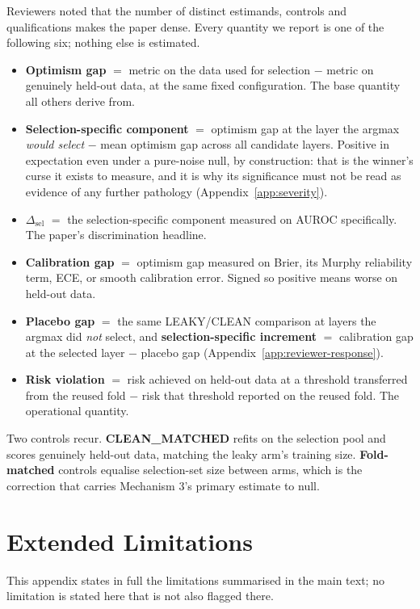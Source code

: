 \documentclass{article}
\begin{document}
Reviewers noted that the number of distinct estimands, controls and
qualifications makes the paper dense. Every quantity we report is one of the
following six; nothing else is estimated.

\begin{itemize}
\itemsep0pt
\item \textbf{Optimism gap} $=$ metric on the data used for selection $-$
  metric on genuinely held-out data, at the same fixed configuration. The base
  quantity all others derive from.
\item \textbf{Selection-specific component} $=$ optimism gap at the layer the
  argmax \emph{would select} $-$ mean optimism gap across all candidate
  layers. Positive in expectation even under a pure-noise null, by
  construction: that is the winner's curse it exists to measure, and it is why
  its significance must not be read as evidence of any further pathology
  (Appendix~\ref{app:severity}).
\item $\Delta_{\text{sel}}$ $=$ the selection-specific component measured on
  AUROC specifically. The paper's discrimination headline.
\item \textbf{Calibration gap} $=$ optimism gap measured on Brier, its Murphy
  reliability term, ECE, or smooth calibration error. Signed so positive means
  worse on held-out data.
\item \textbf{Placebo gap} $=$ the same LEAKY/CLEAN comparison at layers the
  argmax did \emph{not} select, and \textbf{selection-specific increment} $=$
  calibration gap at the selected layer $-$ placebo gap
  (Appendix~\ref{app:reviewer-response}).
\item \textbf{Risk violation} $=$ risk achieved on held-out data at a
  threshold transferred from the reused fold $-$ risk that threshold reported
  on the reused fold. The operational quantity.
\end{itemize}

Two controls recur. \textbf{CLEAN\_MATCHED} refits on the selection pool and
scores genuinely held-out data, matching the leaky arm's training size.
\textbf{Fold-matched} controls equalise selection-set size between arms, which
is the correction that carries Mechanism 3's primary estimate to null.

\section{Extended Limitations}
\label{app:limitations}

This appendix states in full the limitations summarised in the main text; no
limitation is stated here that is not also flagged there.
\end{document}
